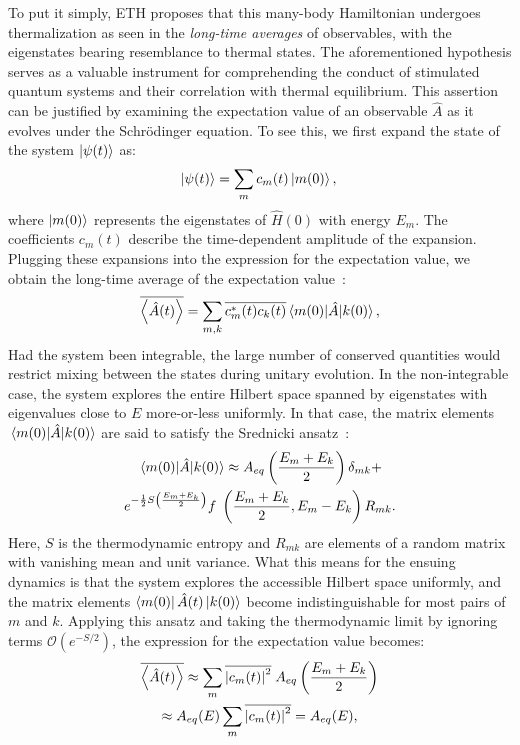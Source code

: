 \documentclass[%
reprint,
superscriptaddress,
amsmath,amssymb,
aps,
prb,
showkeys,
]{revtex4-2}
\begin{document}
To put it simply, ETH proposes that this many-body Hamiltonian undergoes thermalization as seen in the \textit{long-time averages} of observables, with the eigenstates bearing resemblance to thermal states. The aforementioned hypothesis serves as a valuable instrument for comprehending the conduct of stimulated quantum systems and their correlation with thermal equilibrium. This assertion can be justified by examining the expectation value of an observable $\hat{A}$ as it evolves under the Schr\"odinger equation. To see this, we first expand the state of the system $\ket{\psi(t)}$ as:
\begin{equation*}
\ket{\psi(t)} =  \sum_m c_m(t)\ket{m(0)},\\ 
\end{equation*}
where $\ket{m(0)}$ represents the eigenstates of $\hat{H}(0)$ with energy $E_m$. The coefficients $c_m (t)$ describe the time-dependent amplitude of the expansion.
Plugging these expansions into the expression for the expectation value, we obtain the long-time average of the expectation value~\cite{abanin_colloquium_2019}:
\begin{equation}
	\overline{\expval{\hat{A}(t)}} 
	= \sum_{m,k} \overline{c_m^\ast(t) c_k(t)}
	\mel{m(0)}{\hat{A}}{k(0)},
\end{equation}
Had the system been integrable, the large number of conserved quantities would restrict mixing between the states during unitary evolution. In the non-integrable case,
the system explores the entire Hilbert space spanned by eigenstates with eigenvalues close to $E$ more-or-less uniformly. In that case, the matrix elements $\mel{m(0)}{\hat{A}}{k(0)}$ are said to satisfy the Srednicki ansatz~\cite{Srednicki1994,Srednicki_1999}:
\begin{multline}
	\mel{m(0)}{\hat{A}}{k(0)} \approx A_{eq}\left(\frac{E_m+E_k}{2}\right) \delta_{mk} +\\ e^{-\frac12 S\left(\frac{E_m+E_k}{2}\right)} f\;\left(\frac{E_m+E_k}{2}, E_m-E_k\right)R_{mk}.
\end{multline}
Here, $S$ is the thermodynamic entropy and $R_{mk}$ are elements of a random matrix with vanishing mean and unit variance. What this means for the ensuing dynamics is that the system explores the accessible Hilbert space uniformly,  and the matrix elements $\bra{m(0)}\hat{A}(t)\ket{k(0)}$ become indistinguishable for most pairs of $m$ and $k$.
Applying this ansatz and taking the thermodynamic limit by ignoring terms $\mathcal{O}(e^{-S/2})$, the expression for the expectation value becomes:
\begin{multline*}
\overline{\expval{\hat{A}(t)}} \approx \sum_m \overline{\abs{c_m(t)}^2}\; {A}_{eq}\left(\frac{E_m+E_k}{2}\right)\\
 \approx {A}_{eq}(E)\sum_m \overline{\abs{c_m(t)}^2} = A_{eq}(E),
\end{multline*}
\end{document}
